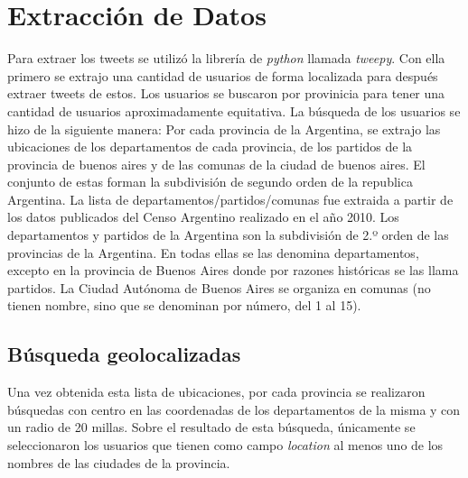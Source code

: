 
\section{Extracción de Datos}

Para extraer los tweets se utilizó la librería de \textit{python} llamada \textit{tweepy}. Con ella primero se extrajo una cantidad de usuarios de forma localizada para después extraer tweets de estos.
Los usuarios se buscaron por provinicia para tener una cantidad de usuarios aproximadamente equitativa.
La búsqueda de los usuarios se hizo de la siguiente manera:
Por cada provincia de la Argentina, se extrajo las ubicaciones de los departamentos de cada provincia, de los partidos de la provincia de buenos aires y de las comunas de la ciudad de buenos aires. El conjunto de estas forman la subdivisión de segundo orden de la republica Argentina. La lista de departamentos/partidos/comunas fue extraida a partir de los datos publicados del Censo Argentino realizado en el año 2010. 
Los departamentos y partidos de la Argentina son la subdivisión de 2.º orden de las provincias de la Argentina. En todas ellas se las denomina departamentos, excepto en la provincia de Buenos Aires donde por razones históricas se las llama partidos. La Ciudad Autónoma de Buenos Aires se organiza en comunas (no tienen nombre, sino que se denominan por número, del 1 al 15).



\subsection{Búsqueda geolocalizadas}
Una vez obtenida esta lista de ubicaciones, por cada provincia se realizaron búsquedas con centro en las coordenadas de los departamentos de la misma y con un radio de 20 millas. Sobre el resultado de esta búsqueda, únicamente se seleccionaron los usuarios que tienen como campo \textit{location} al menos uno de los nombres de las ciudades de la provincia.

